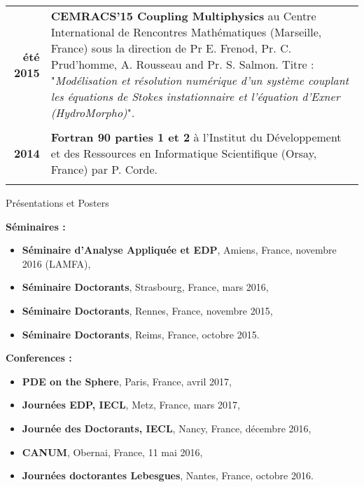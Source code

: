 \documentclass[10pt,a4paper]{report}
\begin{document}
\begin{center}
\begin{tabular}{r p{12cm}}
\textbf{été 2015} & \textbf{CEMRACS'15 Coupling Multiphysics} au Centre International de Rencontres Mathématiques (Marseille, France) sous la direction de Pr E. Frenod, Pr. C. Prud'homme, A. Rousseau and Pr. S. Salmon.\newline
Titre : "\textit{Modélisation et résolution numérique d'un système couplant les équations de Stokes instationnaire et l'équation d'Exner (HydroMorpho)}".\\

& \\

\textbf{2014} & \textbf{Fortran 90 parties 1 et 2} à l'Institut du Développement et des Ressources en Informatique Scientifique (Orsay, France) par P. Corde.\\

& \\

\end{tabular}
\end{center}


\vspace{1cm}
\noindent
{\selectfont
\begin{Large}
Présentations et Posters
\end{Large}
\hrulefill
}
\vspace{0.5cm}

\noindent
{\selectfont
\textbf{Séminaires :}
}

\begin{itemize}
\item \textbf{Séminaire d'Analyse Appliquée et EDP}, Amiens, France, novembre 2016 (LAMFA),
\item \textbf{Séminaire Doctorants}, Strasbourg, France, mars 2016,
\item \textbf{Séminaire Doctorants}, Rennes, France, novembre 2015,
\item \textbf{Séminaire Doctorants}, Reims, France, octobre 2015.
\end{itemize}

\vspace{0.3cm}
\noindent
{\selectfont
\textbf{Conferences :}
}

\begin{itemize}
\item \textbf{PDE on the Sphere}, Paris, France, avril 2017,
\item \textbf{Journées EDP, IECL}, Metz, France, mars 2017,
\item \textbf{Journée des Doctorants, IECL}, Nancy, France, décembre 2016,
\item \textbf{CANUM}, Obernai, France, 11 mai 2016,
\item \textbf{Journées doctorantes Lebesgues}, Nantes, France, octobre 2016.
\end{itemize}
\end{document}
